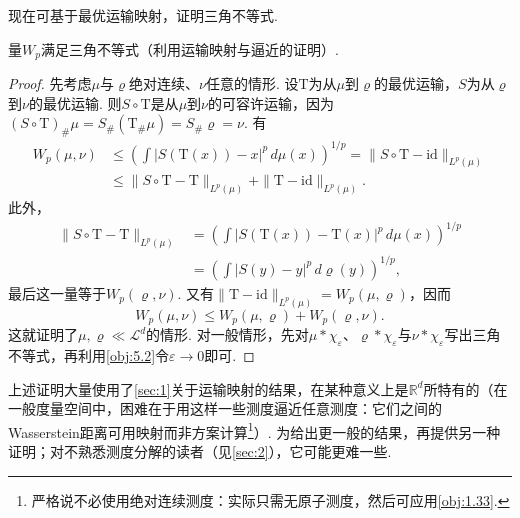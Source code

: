 现在可基于最优运输映射，证明三角不等式.

\begin{lemma}\label{obj:5.3}
量$W_p$满足三角不等式（利用运输映射与逼近的证明）.
\end{lemma}
\begin{proof}
先考虑$\mu$与$\varrho$绝对连续、$\nu$任意的情形. 设$\mathrm T$为从$\mu$到$\varrho$的最优运输，$S$为从$\varrho$到$\nu$的最优运输. 则$S\circ\mathrm T$是从$\mu$到$\nu$的可容许运输，因为$(S\circ\mathrm T)_\#\mu=S_\#(\mathrm T_\#\mu)=S_\#\varrho=\nu$. 有
\[
\begin{aligned}
W_p(\mu,\nu)&\le\left(\int|S(\mathrm T(x))-x|^p\,d\mu(x)\right)^{1/p}
=\|S\circ\mathrm T-\mathrm{id}\|_{L^p(\mu)}\\
&\le\|S\circ\mathrm T-\mathrm T\|_{L^p(\mu)}+\|\mathrm T-\mathrm{id}\|_{L^p(\mu)}.
\end{aligned}
\]
此外，
\[
\begin{aligned}
\|S\circ\mathrm T-\mathrm T\|_{L^p(\mu)}
&=\left(\int|S(\mathrm T(x))-\mathrm T(x)|^p\,d\mu(x)\right)^{1/p}\\
&=\left(\int|S(y)-y|^p\,d\varrho(y)\right)^{1/p},
\end{aligned}
\]
最后这一量等于$W_p(\varrho,\nu)$. 又有$\|\mathrm T-\mathrm{id}\|_{L^p(\mu)}=W_p(\mu,\varrho)$，因而
\[
W_p(\mu,\nu)\le W_p(\mu,\varrho)+W_p(\varrho,\nu).
\]
这就证明了$\mu,\varrho\ll\mathscr L^d$的情形. 对一般情形，先对$\mu*\chi_\varepsilon$、$\varrho*\chi_\varepsilon$与$\nu*\chi_\varepsilon$写出三角不等式，再利用\autoref{obj:5.2}令$\varepsilon\to0$即可.
\end{proof}

上述证明大量使用了\autoref{sec:1}关于运输映射的结果，在某种意义上是$\mathbb R^d$所特有的（在一般度量空间中，困难在于用这样一些测度逼近任意测度：它们之间的Wasserstein距离可用映射而非方案计算\footnote{严格说不必使用绝对连续测度：实际只需无原子测度，然后可应用\autoref{obj:1.33}.}）. 为给出更一般的结果，再提供另一种证明；对不熟悉测度分解的读者（见\autoref{sec:2}），它可能更难一些.

